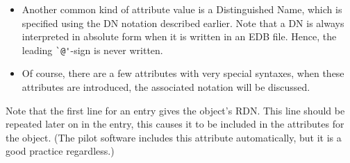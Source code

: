 \begin{itemize}
	If it makes sense to use a particular character, e.g., \verb"`@'"
	in a mail address,
	then this usage is usually permitted.

	If it is necessary to characters from the restricted set,
	proceed the value with \verb"{T.61}", e.g.,
\begin{quote}\small
\begin{verbatim}
{T.61}whatever$you$want
\end{verbatim}\end{quote}

	Always use the appropriate case (upper or lower) when entering
	values.
	Although the Directory supports imprecise matching for searching,
	direct lookup is made on the basis of an exact match.

	When strings are read by the pilot project software,
	it strips leading and trailing blanks and also compresses multiple
	blanks to a single blank space.

\item	Another common kind of attribute value is a Distinguished
	Name, which is specified using the DN notation described earlier.
	Note that a DN is always interpreted in absolute form when it is
	written in an EDB file.
	Hence, the leading \verb"`@'"-sign is never written.

\item	Of course,
	there are a few attributes with very special syntaxes,
	when these attributes are introduced,
	the associated notation will be discussed.
\end{itemize}
Note that the first line for an entry gives the object's RDN.
This line should be repeated later on in the entry,
this causes it to be included in the attributes for the object.
(The pilot software includes this attribute automatically,
but it is a good practice regardless.)

